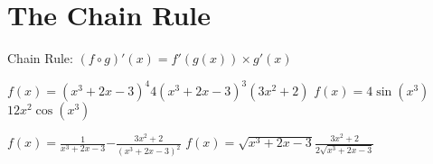 \section{The Chain Rule}


\begin{myframe}[arc=10pt,auto outer arc]
	\centering Chain Rule: $\displaystyle (f\circ g)'(x) = f'(g(x)) \times g'(x)$
\end{myframe}

\pairofprobsans%
{$\displaystyle f\left(x\right) = (x^3 + 2x - 3)^4$}{$\displaystyle 4(x^3 + 2x - 3)^{3}(3x^2 + 2)$}%
{$\displaystyle f\left(x\right) = 4{\sin{(x^3)}}$}{$\displaystyle 12x^2 \cos{(x^3)}$}

\pairofprobsans%
{$\displaystyle f\left(x\right) = \frac{1}{x^3 + 2x - 3}$}{$\displaystyle -\frac{3x^2 + 2}{(x^3 + 2x - 3)^2}$}%
{$\displaystyle f\left(x\right) = \sqrt{x^3 + 2x - 3}$}{$\displaystyle \frac{3x^2 + 2}{2\sqrt{x^3 + 2x - 3}}$}%




